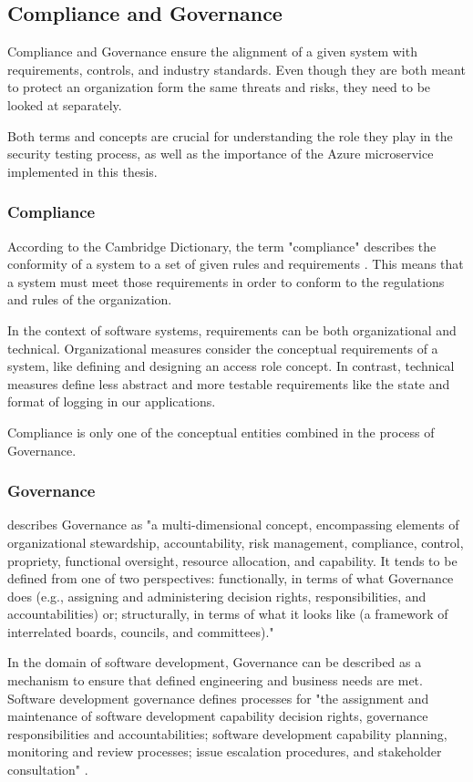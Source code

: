 \subsection{Compliance and Governance}
Compliance and Governance ensure the alignment of a given system with requirements, controls, and industry standards.
Even though they are both meant to protect an organization form the same threats and risks, they need to be looked at separately.

Both terms and concepts are crucial for understanding the role they play in the security testing process, as well as the importance of the Azure microservice implemented in this thesis.

\subsubsection{Compliance}
According to the Cambridge Dictionary, the term "compliance" describes the conformity of a system to a set of given rules and requirements \citep{compliance2020}.
This means that a system must meet those requirements in order to conform to the regulations and rules of the organization. 

In the context of software systems, requirements can be both organizational and technical. Organizational measures consider the conceptual requirements of a system, like defining and designing an access role concept. In contrast, technical measures define less abstract and more testable requirements like the state and format of logging in our applications. 

Compliance is only one of the conceptual entities combined in the process of Governance.

\subsubsection{Governance}
\citep{bannerman2009} describes Governance as "a multi-dimensional concept, encompassing elements of organizational stewardship, accountability, risk management, compliance, control, propriety, functional oversight, resource allocation, and capability. It tends to be defined from one of two perspectives: functionally, in terms of what Governance does (e.g., assigning and administering decision rights, responsibilities, and accountabilities) or; structurally, in terms of what it looks like (a framework of interrelated boards, councils, and committees)."

In the domain of software development, Governance can be described as a mechanism to ensure that defined engineering and business needs are met. Software development governance defines processes for "the assignment and maintenance of software development capability decision rights, governance responsibilities and accountabilities; software development capability planning, monitoring and review processes; issue escalation procedures, and stakeholder consultation" \citep{bannerman2009}.


